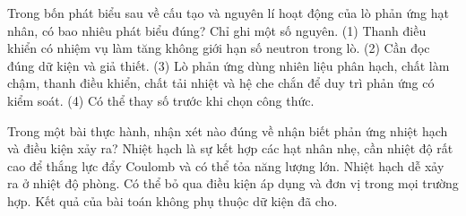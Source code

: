 \begin{ex}
Trong bốn phát biểu sau về cấu tạo và nguyên lí hoạt động của lò phản ứng hạt nhân, có bao nhiêu phát biểu đúng? Chỉ ghi một số nguyên. (1) Thanh điều khiển có nhiệm vụ làm tăng không giới hạn số neutron trong lò. (2) Cần đọc đúng dữ kiện và giả thiết. (3) Lò phản ứng dùng nhiên liệu phân hạch, chất làm chậm, thanh điều khiển, chất tải nhiệt và hệ che chắn để duy trì phản ứng có kiểm soát. (4) Có thể thay số trước khi chọn công thức.
\end{ex}

\begin{ex}
Trong một bài thực hành, nhận xét nào đúng về nhận biết phản ứng nhiệt hạch và điều kiện xảy ra?
\choice
{\True Nhiệt hạch là sự kết hợp các hạt nhân nhẹ, cần nhiệt độ rất cao để thắng lực đẩy Coulomb và có thể tỏa năng lượng lớn.}
{Nhiệt hạch dễ xảy ra ở nhiệt độ phòng.}
{Có thể bỏ qua điều kiện áp dụng và đơn vị trong mọi trường hợp.}
{Kết quả của bài toán không phụ thuộc dữ kiện đã cho.}
\end{ex}


